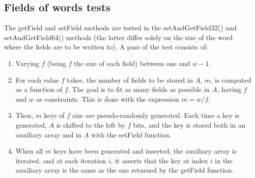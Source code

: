 \subsection{Fields of words tests}
The {\ttfamily getField} and {\ttfamily setField} methods are tested in the {\ttfamily setAndGetField32()} and {\ttfamily setAndGetField64()} methods (the latter differ solely on the size of the word where the fields are to be written to). A pass of the test consists of:
\begin{enumerate}
    \item
    Varying $f$ (being $f$ the size of each field) between one and $w - 1$.
    
    \item
    For each value $f$ takes, the number of fields to be stored in $A$, $m$, is computed as a function of $f$. The goal is to fit as many fields as possible in $A$, having $f$ and $w$ as constraints. This is done with the expression $m = w / f$.
    
    \item
    Then, $m$ keys of $f$ size are pseudo-randomly generated. Each time a key is generated, $A$ is shifted to the left by $f$ bits, and the key is stored both in an auxiliary array and in $A$ with the {\ttfamily setField} function. 
    
    \item
    When all $m$ keys have been generated and inserted, the auxiliary array is iterated, and at each iteration $i$, it asserts that the key at index $i$ in the auxiliary array is the same as the one returned by the {\ttfamily getField} function.
\end{enumerate}

